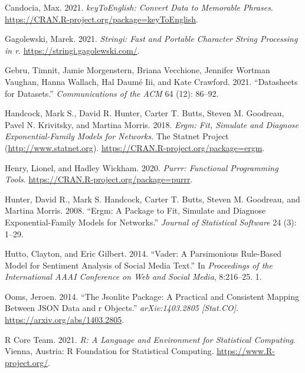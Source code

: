 \documentclass[
]{article}
\newlength{\cslhangindent}
\newlength{\cslentryspacingunit} %
\newenvironment{CSLReferences}[2] %
 {%
  \setlength{\parindent}{0pt}
  \ifodd #1
  \let\oldpar\par
  \def\par{\hangindent=\cslhangindent\oldpar}
  \fi
  \setlength{\parskip}{#2\cslentryspacingunit}
 }%
 {}
\begin{document}
\hypertarget{refs}{}
\begin{CSLReferences}{1}{0}
\leavevmode{}%
Candocia, Max. 2021. \emph{keyToEnglish: Convert Data to Memorable Phrases}. \url{https://CRAN.R-project.org/package=keyToEnglish}.

\leavevmode{}%
Gagolewski, Marek. 2021. \emph{Stringi: Fast and Portable Character String Processing in r}. \url{https://stringi.gagolewski.com/}.

\leavevmode{}%
Gebru, Timnit, Jamie Morgenstern, Briana Vecchione, Jennifer Wortman Vaughan, Hanna Wallach, Hal Daumé Iii, and Kate Crawford. 2021. {``Datasheets for Datasets.''} \emph{Communications of the ACM} 64 (12): 86--92.

\leavevmode{}%
Handcock, Mark S., David R. Hunter, Carter T. Butts, Steven M. Goodreau, Pavel N. Krivitsky, and Martina Morris. 2018. \emph{Ergm: Fit, Simulate and Diagnose Exponential-Family Models for Networks}. The Statnet Project (\url{http://www.statnet.org}). \url{https://CRAN.R-project.org/package=ergm}.

\leavevmode{}%
Henry, Lionel, and Hadley Wickham. 2020. \emph{Purrr: Functional Programming Tools}. \url{https://CRAN.R-project.org/package=purrr}.

\leavevmode{}%
Hunter, David R., Mark S. Handcock, Carter T. Butts, Steven M. Goodreau, and Martina Morris. 2008. {``Ergm: A Package to Fit, Simulate and Diagnose Exponential-Family Models for Networks.''} \emph{Journal of Statistical Software} 24 (3): 1--29.

\leavevmode{}%
Hutto, Clayton, and Eric Gilbert. 2014. {``Vader: A Parsimonious Rule-Based Model for Sentiment Analysis of Social Media Text.''} In \emph{Proceedings of the International AAAI Conference on Web and Social Media}, 8:216--25. 1.

\leavevmode{}%
Ooms, Jeroen. 2014. {``The Jsonlite Package: A Practical and Consistent Mapping Between JSON Data and r Objects.''} \emph{arXiv:1403.2805 {[}Stat.CO{]}}. \url{https://arxiv.org/abs/1403.2805}.

\leavevmode{}%
R Core Team. 2021. \emph{R: A Language and Environment for Statistical Computing}. Vienna, Austria: R Foundation for Statistical Computing. \url{https://www.R-project.org/}.


\end{CSLReferences}
\end{document}
